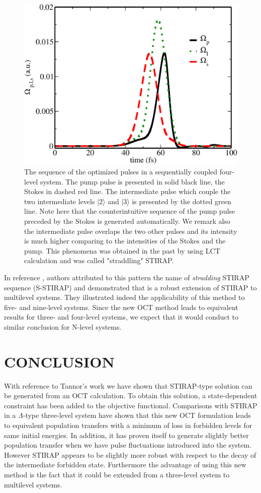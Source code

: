 \documentclass[]{interact}
\theoremstyle{plain}%
\theoremstyle{definition}
\theoremstyle{remark}
\begin{document}
\begin{figure}[h!]
\centering
\includegraphics[width=0.7\linewidth]{Figure12}
\caption{The sequence of the optimized pulses in a sequentially coupled 
four-level system. The pump pulse is presented in solid black line, the Stokes 
in dashed red line. The intermediate pulse which couple the two intermediate 
levels $|2\rangle$ and $|3\rangle$ is presented by the dotted green line. Note 
here that the counterintuitive sequence of the pump pulse preceded by the 
Stokes is generated automatically. We remark also the intermediate pulse 
overlaps the two other pulses and its intensity is much higher comparing to the 
intensities of the Stokes and the pump. This phenomena was obtained in the past 
by using LCT calculation and was called "straddling" STIRAP.
\label{Fig:pulse_four_octnew}}
\end{figure}
\skip 0.2in
In reference \cite{Tannor}, authors attributed to this pattern the name of 
\textit{stradding} STIRAP sequence (S-STIRAP) and demonstrated that is a 
robust extension of STIRAP to multilevel systems. They illustrated indeed the 
applicability of this method to five- and nine-level systems. Since the new 
OCT method leads to equivalent results for three- and four-level systems, we 
expect that it would conduct to similar conclusion for N-level systems.  

\section{CONCLUSION}
With reference to Tannor's work \cite{Tannor} we have shown that 
STIRAP-type solution can be generated from an OCT calculation. To obtain this 
solution, a state-dependent constraint has been added to the objective 
functional. Comparisons with STIRAP in a $\Lambda$-type three-level 
system have shown that this new OCT formulation leads to equivalent 
population transfers with a minimum of loss in forbidden levels for same 
initial 
energies. In addition, it has proven itself to generate slightly better 
population transfer when we have pulse fluctuations introduced into the system. 
However STIRAP appears to be slightly more robust with respect to the decay 
of the intermediate forbidden state. 
Furthermore the advantage of using this new method is the fact that it could be 
extended from a three-level system to multilevel systems.   
\end{document}
